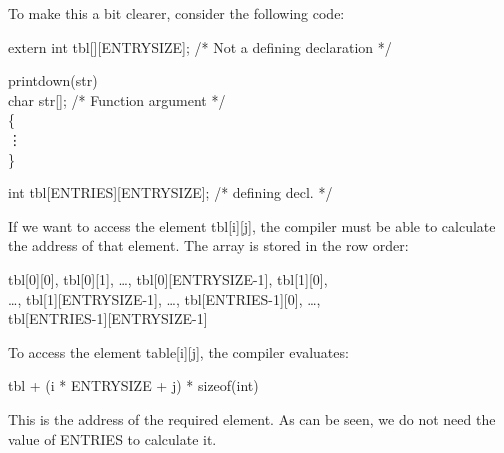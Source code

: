 To make this a bit clearer, consider the following code:
\begin{code}
extern int tbl[][ENTRYSIZE]; /* Not a defining declaration */
\addVspace

printdown(str) \\
char str[]; \tab  /* Function argument */ \\
\{ \\
 \> \vdots	\\
\} \addVspace

int tbl[ENTRIES][ENTRYSIZE]; \tab  /* defining decl. */
\end{code}
\noindent
 If we want to access the element {\cd tbl[i][j]}, the compiler
must be able to calculate the address of that element. The array is
stored in the row order:
\begin{display}\cd
  tbl[0][0], tbl[0][1], \ldots, tbl[0][ENTRYSIZE-1], tbl[1][0], \\
  \ldots, tbl[1][ENTRYSIZE-1], \ldots, tbl[ENTRIES-1][0], \ldots, \\
  tbl[ENTRIES-1][ENTRYSIZE-1]
\end{display}
\noindent
     To access the element {\cd table[i][j]}, the compiler evaluates:
\begin{code}
tbl + (i * ENTRYSIZE + j) * sizeof(int)
\end{code}
\noindent
     This is  the address  of the  required element. As can be seen,
we do not need the value of {\cd ENTRIES} to calculate it.

